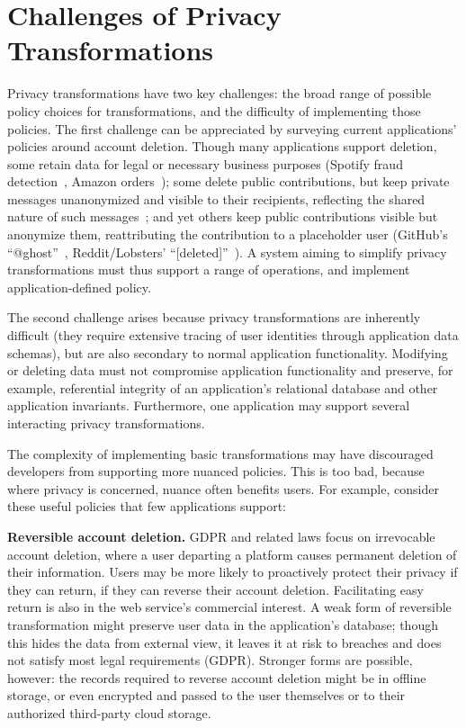 \section{Challenges of Privacy Transformations}
\label{sec:motivation}
%

%
Privacy transformations have two key challenges: the broad
range of possible policy choices for transformations, and the difficulty of
implementing those policies.
%
The first challenge can be appreciated by surveying current applications' policies
around account deletion.
%
Though many applications support deletion,
some retain
data for legal or necessary business purposes (\eg Spotify fraud detection~\cite{spotify:privacy},
Amazon orders~\cite{amazon:privacy}); some delete public contributions, but keep private
messages unanonymized and visible to their recipients, reflecting the
shared nature of such messages~\cite{facebook:privacy, twitter:privacy};
and yet others keep public contributions visible but anonymize them, reattributing the contribution
to a placeholder user (\eg GitHub's ``@ghost''~\cite{github:privacy}, Reddit/Lobsters'
``[deleted]''~\cite{reddit:privacy, lobsters:privacy}).
%
A system aiming to simplify privacy transformations must thus support a range
of operations, and implement application-defined policy.


The second challenge arises because privacy transformations are
inherently difficult (they require extensive tracing of user identities through
application data schemas), but are also secondary to normal application
functionality.
%
Modifying or deleting data must not compromise application functionality and preserve, for example,
referential integrity of an application's relational database and other application invariants.
%
Furthermore, one application may support several interacting privacy
transformations.


The complexity of implementing basic transformations may have discouraged
developers from supporting more nuanced policies.
%
This is too bad, because where privacy is concerned, nuance often benefits
users.
%
For example, consider these useful policies that few applications
support:
%

\textbf{Reversible account deletion.}
%
GDPR and related laws focus on irrevocable account deletion, where
a user departing a platform causes permanent deletion of their information.
%
Users may be more likely to proactively protect their privacy if they
can return, \ie if they can reverse their account deletion.
%
Facilitating easy return is also in the web service's commercial interest.
%
A weak form of reversible transformation might preserve user data in the
application's database; though this hides the data from external view,
it leaves it at risk to breaches and does not satisfy most legal requirements
(\eg GDPR).
%
Stronger forms are possible, however: the records required to reverse account
deletion might be in offline storage, or even encrypted and passed to the
user themselves or to their authorized third-party cloud storage.
%

